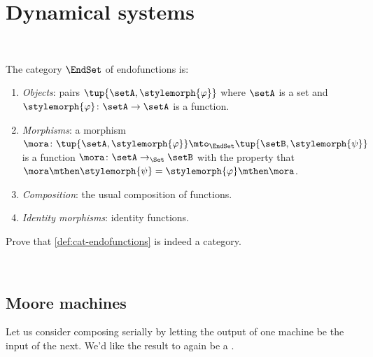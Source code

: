 
\section[Dynamical systems]{Dynamical systems}
\label{sec:cat-dyn}


\

\begin{ctdefinition}[Endofunctions]
    \label{def:cat-endofunctions}
    The category $\EndSet$ of endofunctions is:
    \begin{enumerate}
        \item \emph{Objects}: pairs $\tup{\setA, \stylemorph{\varphi}}$ where $\setA$ is a set and $\stylemorph{\varphi} \colon \setA \to \setA$ is a function.
        \item \emph{Morphisms}: a morphism $\mora \colon \tup{\setA, \stylemorph{\varphi}} \mto_\EndSet \tup{\setB, \stylemorph{\psi}}$ is a function $\mora \colon \setA \to_\Set \setB$ with the property that $\mora \mthen \stylemorph{\psi}= \stylemorph{\varphi} \mthen \mora$.
        \item \emph{Composition}: the usual composition of functions.
        \item \emph{Identity morphisms}: identity functions.
    \end{enumerate}
\end{ctdefinition}

\begin{exercise}
    Prove that \cref{def:cat-endofunctions} is indeed a category.
\end{exercise}

\begin{solution}
\end{solution}

\



\subsection{Moore machines}



Let us consider composing  serially by letting the output of one machine be the input of the next.
We'd like the result to again be a .

\begin{marginfigure}
    \centering
    \caption{Composition of  (first version).}
    \label{fig:comp_moore_1}
\end{marginfigure}

